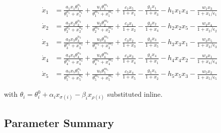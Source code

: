 \documentclass{article}
\begin{document}
\begin{equation}\label{eq:explicit}
\begin{aligned}
\dot{x}_1 &= \frac{a_1 x_1 \theta_1^{n_1}}{\theta_1^{n_1} + x_1^{n_1}}
           + \frac{u_1 \theta_1^{m_1}}{\theta_1^{m_1} + x_1^{m_1}}
           + \frac{c_1 x_5}{1 + x_1}
           - \frac{g_1 x_1}{1 + x_3}
           - h_1 x_1 x_4
           - \frac{w_1 x_3}{1 + x_1/\epsilon_1}\\[8pt]
\dot{x}_2 &= \frac{a_2 x_2 \theta_2^{n_2}}{\theta_2^{n_2} + x_2^{n_2}}
           + \frac{u_2 \theta_2^{m_2}}{\theta_2^{m_2} + x_2^{m_2}}
           + \frac{c_2 x_1}{1 + x_2}
           - \frac{g_2 x_2}{1 + x_4}
           - h_2 x_2 x_5
           - \frac{w_2 x_4}{1 + x_2/\epsilon_2}\\[8pt]
\dot{x}_3 &= \frac{a_3 x_3 \theta_3^{n_3}}{\theta_3^{n_3} + x_3^{n_3}}
           + \frac{u_3 \theta_3^{m_3}}{\theta_3^{m_3} + x_3^{m_3}}
           + \frac{c_3 x_2}{1 + x_3}
           - \frac{g_3 x_3}{1 + x_5}
           - h_3 x_3 x_1
           - \frac{w_3 x_5}{1 + x_3/\epsilon_3}\\[8pt]
\dot{x}_4 &= \frac{a_4 x_4 \theta_4^{n_4}}{\theta_4^{n_4} + x_4^{n_4}}
           + \frac{u_4 \theta_4^{m_4}}{\theta_4^{m_4} + x_4^{m_4}}
           + \frac{c_4 x_3}{1 + x_4}
           - \frac{g_4 x_4}{1 + x_1}
           - h_4 x_4 x_2
           - \frac{w_4 x_1}{1 + x_4/\epsilon_4}\\[8pt]
\dot{x}_5 &= \frac{a_5 x_5 \theta_5^{n_5}}{\theta_5^{n_5} + x_5^{n_5}}
           + \frac{u_5 \theta_5^{m_5}}{\theta_5^{m_5} + x_5^{m_5}}
           + \frac{c_5 x_4}{1 + x_5}
           - \frac{g_5 x_5}{1 + x_2}
           - h_5 x_5 x_3
           - \frac{w_5 x_2}{1 + x_5/\epsilon_5}
\end{aligned}
\end{equation}

\noindent
with $\theta_i = \theta_i^0 + \alpha_i x_{\sigma(i)} - \beta_i x_{\rho(i)}$
substituted inline.

\subsection{Parameter Summary}
\end{document}
